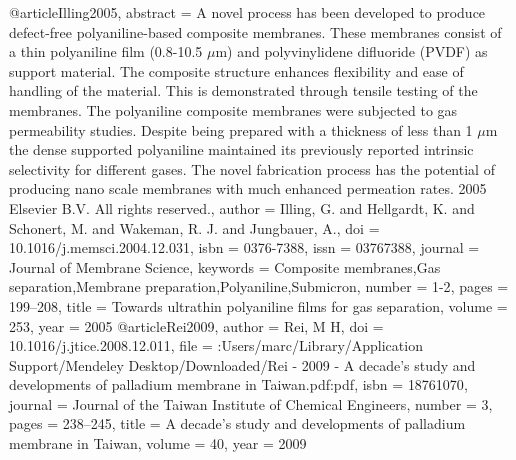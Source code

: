 @article{Illing2005,
abstract = {A novel process has been developed to produce defect-free polyaniline-based composite membranes. These membranes consist of a thin polyaniline film (0.8-10.5 $\mu$m) and polyvinylidene difluoride (PVDF) as support material. The composite structure enhances flexibility and ease of handling of the material. This is demonstrated through tensile testing of the membranes. The polyaniline composite membranes were subjected to gas permeability studies. Despite being prepared with a thickness of less than 1 $\mu$m the dense supported polyaniline maintained its previously reported intrinsic selectivity for different gases. The novel fabrication process has the potential of producing nano scale membranes with much enhanced permeation rates. {\textcopyright} 2005 Elsevier B.V. All rights reserved.},
author = {Illing, G. and Hellgardt, K. and Schonert, M. and Wakeman, R. J. and Jungbauer, A.},
doi = {10.1016/j.memsci.2004.12.031},
isbn = {0376-7388},
issn = {03767388},
journal = {Journal of Membrane Science},
keywords = {Composite membranes,Gas separation,Membrane preparation,Polyaniline,Submicron},
number = {1-2},
pages = {199--208},
title = {{Towards ultrathin polyaniline films for gas separation}},
volume = {253},
year = {2005}
}
@article{Rei2009,
author = {Rei, M H},
doi = {10.1016/j.jtice.2008.12.011},
file = {:Users/marc/Library/Application Support/Mendeley Desktop/Downloaded/Rei - 2009 - A decade's study and developments of palladium membrane in Taiwan.pdf:pdf},
isbn = {18761070},
journal = {Journal of the Taiwan Institute of Chemical Engineers},
number = {3},
pages = {238--245},
title = {{A decade's study and developments of palladium membrane in Taiwan}},
volume = {40},
year = {2009}
}

